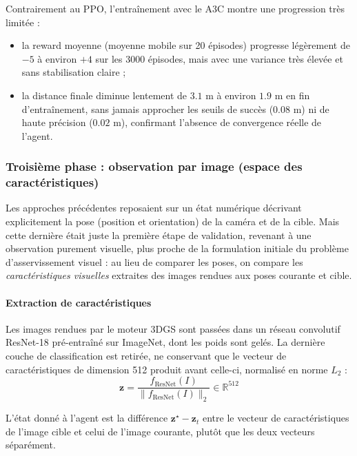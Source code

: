 Contrairement au PPO, l'entraînement avec le A3C montre une progression très limitée :

\begin{itemize}[noitemsep, topsep=4pt]
    \item la reward moyenne (moyenne mobile sur 20 épisodes) progresse 
    légèrement de $-5$ à environ $+4$ sur les 3000 épisodes, mais avec 
    une variance très élevée et sans stabilisation claire ;
    \item la distance finale diminue lentement de $3.1$ m à environ 
    $1.9$ m en fin d'entraînement, sans jamais approcher les seuils 
    de succès ($0.08$ m) ni de haute précision ($0.02$ m), confirmant 
    l'absence de convergence réelle de l'agent.
\end{itemize}

\subsubsection{Troisième phase : observation par image (espace des caractéristiques)}


Les approches précédentes reposaient sur un état numérique décrivant
explicitement la pose (position et orientation) de la caméra et de la
cible. Mais cette dernière était juste la première étape de validation, revenant à une observation
purement visuelle, plus proche de la formulation initiale du problème
d'asservissement visuel : au lieu de comparer les poses, on compare les
\emph{caractéristiques visuelles} extraites des images rendues aux poses
courante et cible.

\paragraph{Extraction de caractéristiques}

Les images rendues par le moteur 3DGS sont passées dans un réseau
convolutif ResNet-18 pré-entraîné sur ImageNet, dont les poids sont gelés. La dernière couche de
classification est retirée, ne conservant que le vecteur de
caractéristiques de dimension 512 produit avant celle-ci, normalisé en
norme $L_2$ :
\begin{equation}
    \mathbf{z} = \frac{f_{\text{ResNet}}(I)}{\lVert f_{\text{ResNet}}(I) \rVert_2} \in \mathbb{R}^{512}
\end{equation}

L'état donné à l'agent est la différence $\mathbf{z}^\star - \mathbf{z}_t$
entre le vecteur de caractéristiques de l'image cible et celui de l'image
courante, plutôt que les deux vecteurs séparément.

